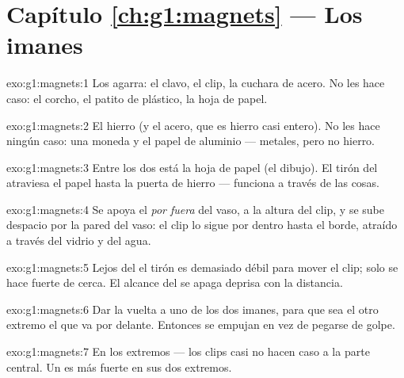 \section*{Capítulo \ref{ch:g1:magnets} --- Los imanes}

\begin{solution}{exo:g1:magnets:1}
Los agarra: el clavo, el clip, la cuchara de acero. No les hace caso:
el corcho, el patito de plástico, la hoja de papel.
\end{solution}

\begin{solution}{exo:g1:magnets:2}
El hierro (y el acero, que es hierro casi entero). No les hace ningún
caso: una moneda y el papel de aluminio --- metales, pero no hierro.
\end{solution}

\begin{solution}{exo:g1:magnets:3}
Entre los dos está la hoja de papel (el dibujo). El tirón del 
atraviesa el papel hasta la puerta de hierro --- funciona a través de
las cosas.
\end{solution}

\begin{solution}{exo:g1:magnets:4}
Se apoya el  \emph{por fuera} del vaso, a la altura del clip, y
se sube despacio por la pared del vaso: el clip lo sigue por dentro
hasta el borde, atraído a través del vidrio y del agua.
\end{solution}

\begin{solution}{exo:g1:magnets:5}
Lejos del  el tirón es demasiado débil para mover el clip; solo
se hace fuerte de cerca. El alcance del  se apaga deprisa con la
distancia.
\end{solution}

\begin{solution}{exo:g1:magnets:6}
Dar la vuelta a uno de los dos imanes, para que sea el otro extremo
el que va por delante. Entonces se empujan en vez de pegarse de golpe.
\end{solution}

\begin{solution}{exo:g1:magnets:7}
En los extremos --- los clips casi no hacen caso a la parte central.
Un  es más fuerte en sus dos extremos.
\end{solution}

